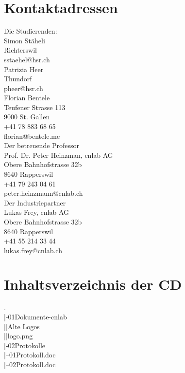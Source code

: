 \section{Kontaktadressen}
Die Studierenden:\\
Simon Stäheli\\
Richterswil\\
sstaehel@hsr.ch\\

Patrizia Heer\\
Thundorf\\
pheer@hsr.ch\\

Florian Bentele\\
Teufener Strasse 113\\
9000 St. Gallen\\
+41 78 883 68 65\\
florian@bentele.me\\

Der betreuende Professor\\
Prof. Dr. Peter Heinzman, cnlab AG\\
Obere Bahnhofstrasse 32b\\
8640 Rapperswil\\
+41 79 243 04 61\\
peter.heinzmann@cnlab.ch\\

Der Industriepartner\\
Lukas Frey, cnlab AG\\
Obere Bahnhofstrasse 32b\\
8640 Rapperswil\\
+41 55 214 33 44\\
lukas.frey@cnlab.ch

\section{Inhaltsverzeichnis der CD}
.\\
|-01Dokumente-cnlab\\
||Alte Logos\\
||logo.png\\
|-02Protokolle\\
|--01Protokoll.doc\\
|--02Protokoll.doc\\

